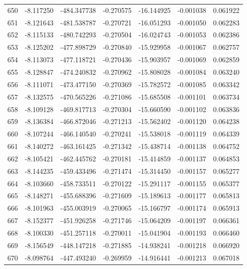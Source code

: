 \begin{tabular}{rrrrrrr}
 650 &  -8.117250 & -484.347738 & -0.270575 &  -16.144925 &   -0.001038 &  0.061922 \\
 651 &  -8.121643 & -481.538787 & -0.270721 &  -16.051293 &   -0.001050 &  0.062283 \\
 652 &  -8.115133 & -480.742293 & -0.270504 &  -16.024743 &   -0.001053 &  0.062386 \\
 653 &  -8.125202 & -477.898729 & -0.270840 &  -15.929958 &   -0.001067 &  0.062757 \\
 654 &  -8.113073 & -477.118721 & -0.270436 &  -15.903957 &   -0.001069 &  0.062859 \\
 655 &  -8.128847 & -474.240832 & -0.270962 &  -15.808028 &   -0.001084 &  0.063240 \\
 656 &  -8.111071 & -473.477150 & -0.270369 &  -15.782572 &   -0.001085 &  0.063342 \\
 657 &  -8.132575 & -470.565226 & -0.271086 &  -15.685508 &   -0.001101 &  0.063734 \\
 658 &  -8.109128 & -469.817713 & -0.270304 &  -15.660590 &   -0.001102 &  0.063836 \\
 659 &  -8.136384 & -466.872046 & -0.271213 &  -15.562402 &   -0.001120 &  0.064238 \\
 660 &  -8.107244 & -466.140540 & -0.270241 &  -15.538018 &   -0.001119 &  0.064339 \\
 661 &  -8.140272 & -463.161425 & -0.271342 &  -15.438714 &   -0.001138 &  0.064752 \\
 662 &  -8.105421 & -462.445762 & -0.270181 &  -15.414859 &   -0.001137 &  0.064853 \\
 663 &  -8.144235 & -459.433496 & -0.271474 &  -15.314450 &   -0.001157 &  0.065277 \\
 664 &  -8.103660 & -458.733511 & -0.270122 &  -15.291117 &   -0.001155 &  0.065377 \\
 665 &  -8.148271 & -455.688396 & -0.271609 &  -15.189613 &   -0.001177 &  0.065813 \\
 666 &  -8.101963 & -455.003919 & -0.270065 &  -15.166797 &   -0.001174 &  0.065913 \\
 667 &  -8.152377 & -451.926258 & -0.271746 &  -15.064209 &   -0.001197 &  0.066361 \\
 668 &  -8.100330 & -451.257118 & -0.270011 &  -15.041904 &   -0.001193 &  0.066460 \\
 669 &  -8.156549 & -448.147218 & -0.271885 &  -14.938241 &   -0.001218 &  0.066920 \\
 670 &  -8.098764 & -447.493240 & -0.269959 &  -14.916441 &   -0.001213 &  0.067018 \\

\end{tabular}
